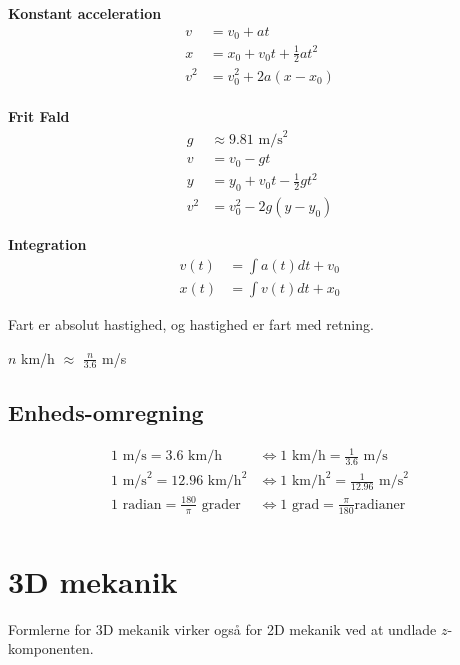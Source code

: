 \begin{table}[h]
\begin{minipage}
        \textbf{Konstant acceleration}
        \begin{align*}
            v &= v_0 + at \\
            x &= x_0 + v_0t + \frac{1}{2}at^2 \\
            v^2 &= v_0^2 + 2a(x-x_0)
        \end{align*}
        \vspace{2em} \\
        \textbf{Frit Fald}
        \begin{align*}
            g &\approx 9.81 \text{ m/s}^2 \\
            v &= v_0 - gt \\
            y &= y_0 + v_0t - \frac{1}{2}gt^2 \\
            v^2 &= v_0^2 - 2g(y-y_0)
        \end{align*}
    \end{minipage}
\end{table}

\textbf{Integration}
\begin{align*}
    v(t) &= \int a(t) dt + v_0 \\
    x(t) &= \int v(t) dt + x_0 
\end{align*}

Fart er absolut hastighed, og hastighed er fart med retning.

$n$ km/h $\approx$ $\frac{n}{3.6}$ m/s

\subsection{Enheds-omregning}
\begin{align*}
    1 \text{ m/s} = 3.6 \text{ km/h} &\iff
    1 \text{ km/h} = \frac{1}{3.6} \text{ m/s} \\
    1 \text{ m/s}^2 = 12.96 \text{ km/h}^2 &\iff
    1 \text{ km/h}^2 = \frac{1}{12.96} \text{ m/s}^2 \\
    1 \text{ radian} = \frac{180}{\pi} \text{ grader} &\iff
    1 \text{ grad} = \frac{\pi}{180} \text{radianer} \\
\end{align*}

\newpage
\section{3D mekanik}

Formlerne for 3D mekanik virker også for 2D mekanik ved at undlade $z$-komponenten.


